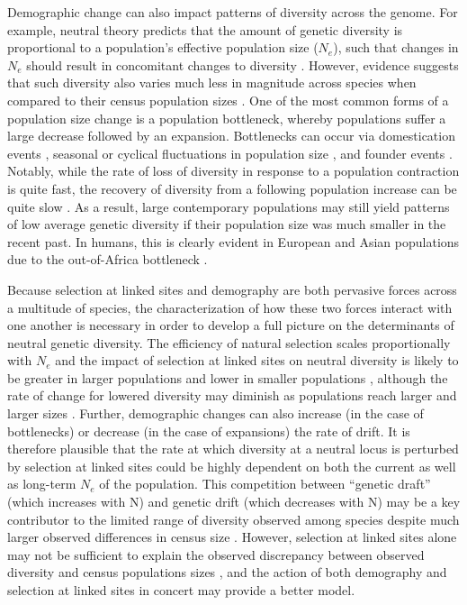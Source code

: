 \documentclass[9pt,twocolumn,twoside]{rilabRxiv}
\begin{document}
Demographic change can also impact patterns of diversity across the genome.
For example, neutral theory predicts that the amount of genetic diversity is proportional to a population’s effective population size (\textit{$N_e$}), such that changes in \textit{$N_e$} should result in concomitant changes to diversity \citep{kimura1983neutral}.
However, evidence suggests that such diversity also varies much less in magnitude across species when compared to their census population sizes \citep{lewontin1974genetic, leffler2012revisiting}.
One of the most common forms of a population size change is a population bottleneck, whereby populations suffer a large decrease followed by an expansion.
Bottlenecks can occur via domestication events \citep{doebley2006molecular, tang2010domestication, wiener2011deciphering, gaut2018demography}, seasonal or cyclical fluctuations in population size \citep{elton1924periodic, ives1970further, itoh2009seasonal, noren2014genetic}, and founder events \citep{david1988genetic, dlugosch2008founding, henn2012great}.
Notably, while the rate of loss of diversity in response to a population contraction is quite fast, the recovery of diversity from a following population increase can be quite slow \citep{charlesworth2009effective}.
As a result, large contemporary populations may still yield patterns of low average genetic diversity if their population size was much smaller in the recent past.
In humans, this is clearly evident in European and Asian populations due to the out-of-Africa bottleneck \citep{10002015global}.

Because selection at linked sites and demography are both pervasive forces across a multitude of species, the characterization of how these two forces interact with one another is necessary in order to develop a full picture on the determinants of neutral genetic diversity.
The efficiency of natural selection scales proportionally with \textit{$N_e$} and the impact of selection at linked sites on neutral diversity is likely to be greater in larger populations and lower in smaller populations \citep{kaplan1989hitchhiking, cutter2013genomic, corbett2015natural}, although the rate of change for lowered diversity may diminish as populations reach larger and larger sizes \citep{gillespie2001population, santiago2016joint}.
Further, demographic changes can also increase (in the case of bottlenecks) or decrease (in the case of expansions) the rate of drift.
It is therefore plausible that the rate at which diversity at a neutral locus is perturbed by selection at linked sites could be highly dependent on both the current as well as long-term \textit{$N_e$} of the population.
This competition between “genetic draft” (which increases with N) and genetic drift (which decreases with N) may be a key contributor to the limited range of diversity observed among species  despite much larger observed differences in census size \citep{gillespie2001population, corbett2015natural, santiago2016joint}.
However, selection at linked sites alone may not be sufficient to explain the observed discrepancy between observed diversity and census populations sizes \citep{coop2016does}, and the action of both demography and selection at linked sites in concert may provide a better model.
\end{document}
